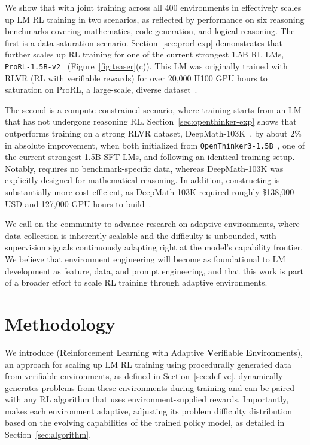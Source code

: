 \documentclass{article}
\theoremstyle{plain}
\theoremstyle{definition}
\theoremstyle{remark}
\begin{document}
We show that \ours{} with joint training across all 400 environments in \suite{} effectively scales up LM RL training in two scenarios, as reflected by performance on six reasoning benchmarks covering mathematics, code generation, and logical reasoning.
The first is a data-saturation scenario.
Section~\ref{sec:prorl-exp} demonstrates that \ours{} further scales up RL training for one of the current strongest 1.5B RL LMs, \texttt{ProRL-1.5B-v2}~\citep{hu2025prorlv2} (Figure~\ref{fig:teaser}(c)).
This LM was originally trained with RLVR (RL with verifiable rewards) for over 20{,}000 H100 GPU hours to saturation on ProRL, a large-scale, diverse dataset~\citep{liu2025prorl}.

The second is a compute-constrained scenario, where training starts from an LM that has not undergone reasoning RL.
Section~\ref{sec:openthinker-exp} shows that \ours{} outperforms training on a strong RLVR dataset, DeepMath-103K~\citep{he2025deepmath}, by about 2\% in absolute improvement, when both initialized from \texttt{OpenThinker3-1.5B}~\citep{guha2025openthoughts}, one of the current strongest 1.5B SFT LMs, and following an identical training setup.
Notably, \ours{} requires no benchmark-specific data, whereas DeepMath-103K was explicitly designed for mathematical reasoning.
In addition, constructing \suite{} is substantially more cost-efficient, as DeepMath-103K required roughly \$138{,}000 USD and 127{,}000 GPU hours to build~\citep{he2025deepmath}.




We call on the community to advance research on adaptive environments, where data collection is inherently scalable and the difficulty is unbounded, with supervision signals continuously adapting right at the model’s capability frontier.
We believe that environment engineering will become as foundational to LM development as feature, data, and prompt engineering, and that this work is part of a broader effort to scale RL training through adaptive environments.






\section{Methodology}

We introduce \textbf{\ours{}} (\textbf{R}einforcement \textbf{L}earning with Adaptive \textbf{V}erifiable \textbf{E}nvironments), an approach for scaling up LM RL training using procedurally generated data from verifiable environments, as defined in Section~\ref{sec:def-ve}.
\ours{} dynamically generates problems from these environments during training and can be paired with any RL algorithm that uses environment-supplied rewards.
Importantly, \ours{} makes each environment adaptive, adjusting its problem difficulty distribution based on the evolving capabilities of the trained policy model, as detailed in Section~\ref{sec:algorithm}.
\end{document}
